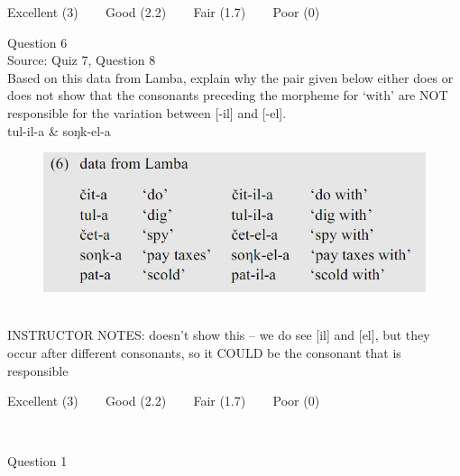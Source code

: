 \documentclass[12pt]{article}
\begin{document}
\vfill
Excellent (3) ~~~ Good (2.2) ~~~ Fair (1.7) ~~~ Poor (0)
\newpage

{\large Question 6}\\

Source: Quiz 7, Question 8\\

Based on this data from Lamba, explain why the pair given below either does or does not show that the consonants preceding the morpheme for `with' are NOT responsible for the variation between [-il] and [-el].\\

tul-il-a \& soŋk-el-a

\begin{figure}[H]
\includegraphics{../images/peng119_lamba.png}
\end{figure}

~\\
INSTRUCTOR NOTES: doesn't show this -- we do see [il] and [el], but they occur after different consonants, so it COULD be the consonant that is responsible


\vfill
Excellent (3) ~~~ Good (2.2) ~~~ Fair (1.7) ~~~ Poor (0)
\newpage

\begin{center}
\textbf{{\color{red}{\HUGE END OF EXAM}}}\\

\end{center}
\newpage

\begin{center}
\textbf{{\color{blue}{\HUGE START OF EXAM\\}}}

\textbf{{\color{blue}{\HUGE Student ID: 8742\\}}}

\textbf{{\color{blue}{\HUGE 2:00 - 2:20 PM\\}}}

\end{center}
\newpage

{\large Question 1}\\
\end{document}
